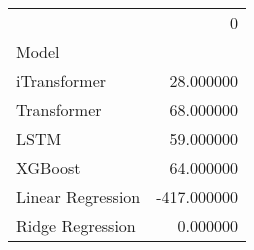 \begin{tabular}{lr}
\toprule
 & 0 \\
Model &  \\
\midrule
iTransformer & 28.000000 \\
Transformer & 68.000000 \\
LSTM & 59.000000 \\
XGBoost & 64.000000 \\
Linear Regression & -417.000000 \\
Ridge Regression & 0.000000 \\
\bottomrule
\end{tabular}
